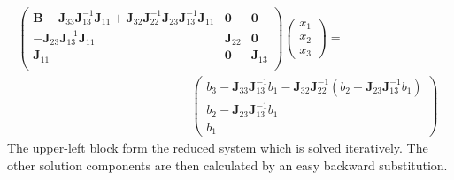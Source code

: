 \begin{align}
\begin{pmatrix}
\mathbf{B} - \mathbf{J}_{33}\mathbf{J}_{13}^{-1}\mathbf{J}_{11} + \mathbf{J}_{32}\mathbf{J}_{22}^{-1}\mathbf{J}_{23}\mathbf{J}_{13}^{-1}\mathbf{J}_{11} & \mathbf{0} & \mathbf{0} \\
-\mathbf{J}_{23}\mathbf{J}_{13}^{-1}\mathbf{J}_{11} & \mathbf{J}_{22} & \mathbf{0}   \\
\mathbf{J}_{11} & \mathbf{0} & \mathbf{J}_{13} \\
\end{pmatrix}\begin{pmatrix}
x_1 \\ x_2 \\ x_3 
\end{pmatrix} =  \qquad\qquad\qquad\qquad\nonumber \\ \qquad\qquad\qquad\qquad\qquad\qquad\qquad
\begin{pmatrix}
b_3 - \mathbf{J}_{33}\mathbf{J}_{13}^{-1}b_1 - \mathbf{J}_{32}\mathbf{J}_{22}^{-1}\left(b_2 - \mathbf{J}_{23}\mathbf{J}_{13}^{-1}b_1\right) 
\\ b_2 - \mathbf{J}_{23}\mathbf{J}_{13}^{-1}b_1 
\\ b_1 
\end{pmatrix}
\end{align}
The upper-left block form the reduced system which is solved iteratively. The other solution components are then calculated by an easy backward substitution.
